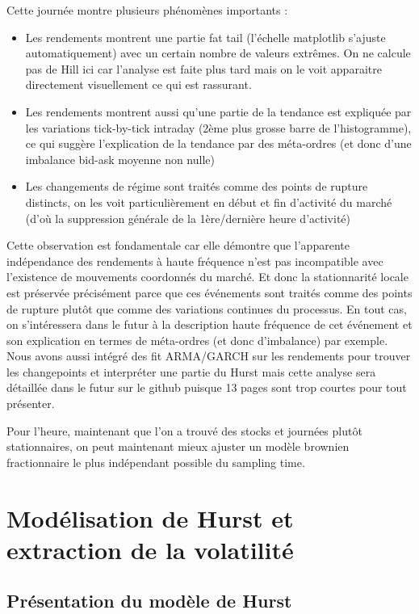 \documentclass[10pt,a4paper]{article}
\theoremstyle{definition}
\theoremstyle{remark}
\begin{document}
Cette journée montre plusieurs phénomènes importants :

\begin{itemize}    
        \item Les rendements montrent une partie fat tail (l'échelle matplotlib s'ajuste automatiquement) avec un certain nombre de valeurs extrêmes. On ne calcule pas de Hill ici car l'analyse est faite plus tard mais on le voit apparaitre directement visuellement ce qui est rassurant.
        \item Les rendements montrent aussi qu'une partie de la tendance est expliquée par les variations tick-by-tick intraday (2ème plus grosse barre de l'histogramme), ce qui suggère l'explication de la tendance par des méta-ordres (et donc d'une imbalance bid-ask moyenne non nulle)
        \item Les changements de régime sont traités comme des points de rupture distincts, on les voit particulièrement en début et fin d'activité  du marché (d'où la suppression générale de la 1ère/dernière heure d'activité)
\end{itemize}


Cette observation est fondamentale car elle démontre que l'apparente indépendance des rendements à haute fréquence n'est pas incompatible avec l'existence de mouvements coordonnés du marché. 
Et donc la stationnarité locale est préservée précisément parce que ces événements sont traités comme des points de rupture plutôt que comme des variations continues du processus.
En tout cas, on s'intéressera dans le futur à la description haute fréquence de cet événement et son explication en termes de méta-ordres (et donc d'imbalance) par exemple. 
Nous avons aussi intégré des fit ARMA/GARCH sur les rendements pour trouver les changepoints et interpréter une partie du Hurst mais cette analyse sera détaillée dans le futur sur le github puisque 13 pages sont trop courtes pour tout présenter.

Pour l'heure, maintenant que l'on a trouvé des stocks et journées plutôt stationnaires, on peut maintenant mieux ajuster un modèle brownien fractionnaire le plus indépendant possible du sampling time.


\section{Modélisation de Hurst et extraction de la volatilité}

\subsection{Présentation du modèle de Hurst}
\end{document}
